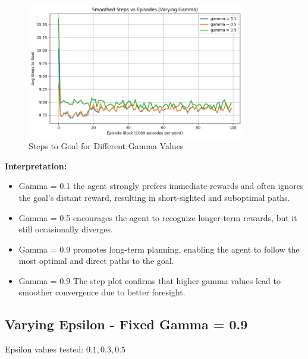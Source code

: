 \documentclass[12pt]{article}
\begin{document}
\begin{figure}[H]
  \centering
  \includegraphics[width=0.85\textwidth]{images/part1_q2_steps_vs_gamma.png}
  \caption{Steps to Goal for Different Gamma Values}
\end{figure}

\textbf{Interpretation:}
\begin{itemize}
  \item Gamma = 0.1 the agent strongly prefers immediate rewards and often ignores the goal's distant reward, resulting in short-sighted and suboptimal paths.
  \item Gamma = 0.5 encourages the agent to recognize longer-term rewards, but it still occasionally diverges.
  \item Gamma = 0.9 promotes long-term planning, enabling the agent to follow the most optimal and direct paths to the goal.
  \item Gamma = 0.9 The step plot confirms that higher gamma values lead to smoother convergence due to better foresight.
\end{itemize}

\subsection{Varying Epsilon - Fixed Gamma = 0.9}
Epsilon values tested: \(0.1, 0.3, 0.5\)
\end{document}
